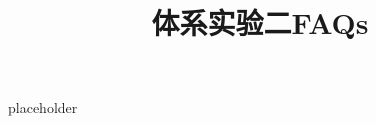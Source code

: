 \documentclass{article}
\title{\textbf{体系实验二FAQs}\vspace{-2em}}
\author{}
\date{}
\begin{document}
\maketitle

placeholder
\end{document}
